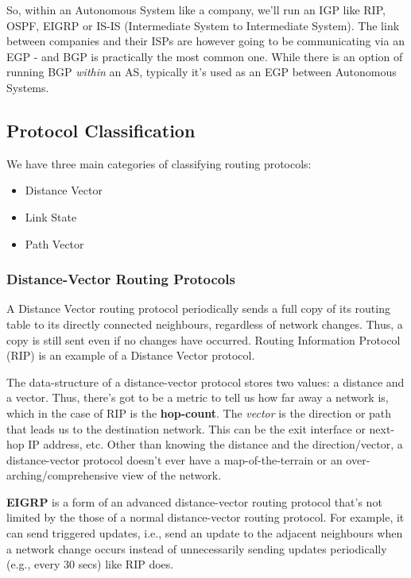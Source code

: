 So, within an Autonomous System like a company, we'll run an IGP like RIP, OSPF, EIGRP or IS-IS (Intermediate System to Intermediate System). The link between companies and their ISPs are however going to be communicating via an EGP - and BGP is practically the most common one. While there is an option of running BGP \textit{within} an AS, typically it's used as an EGP between Autonomous Systems. 

\subsection{Protocol Classification}
We have three main categories of classifying routing protocols: 

\vspace{-10pt}
\begin{itemize}
\item Distance Vector
\item Link State
\item Path Vector
\end{itemize}
\vspace{-10pt}

\subsubsection{Distance-Vector Routing Protocols}
A Distance Vector routing protocol periodically sends a full copy of its routing table to its directly connected neighbours, regardless of network changes. Thus, a copy is still sent even if no changes have occurred. Routing Information Protocol (RIP) is an example of a Distance Vector protocol. 

The data-structure of a distance-vector protocol stores two values: a distance and a vector. Thus, there's got to be a metric to tell us how far away a network is, which in the case of RIP is the \textbf{hop-count}. The \textit{vector} is the direction or path that leads us to the destination network. This can be the exit interface or next-hop IP address, etc. Other than knowing the distance and the direction/vector, a distance-vector protocol doesn't ever have a map-of-the-terrain or an over-arching/comprehensive view of the network.

\textbf{EIGRP} is a form of an advanced distance-vector routing protocol that's not limited by the those of a normal distance-vector routing protocol. For example, it can send triggered updates, i.e., send an update to the adjacent neighbours when a network change occurs instead of unnecessarily sending updates periodically (e.g., every 30 secs) like RIP does. 

